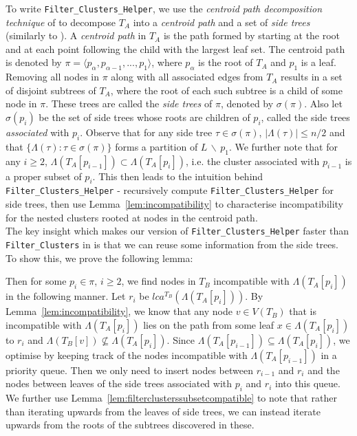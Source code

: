 \documentclass{article}
\newcommand{\leafset}{\Lambda}
\begin{document}
    To write \texttt{Filter\_Clusters\_Helper}, we use the \textit{centroid path decomposition technique} of \cite{cole2000n} to decompose $T_A$ into a \textit{centroid path} and a set of \textit{side trees} (similarly to \cite{jansson2018algorithms}). A \textit{centroid path} in $T_A$ is the path formed by starting at the root and at each point following the child with the largest leaf set. The centroid path is denoted by $\pi = \langle p_{\alpha}, p_{\alpha - 1}, ..., p_1 \rangle$, where $p_{\alpha}$ is the root of $T_A$ and $p_1$ is a leaf. Removing all nodes in $\pi$ along with all associated edges from $T_A$ results in a set of disjoint subtrees of $T_A$, where the root of each such subtree is a child of some node in $\pi$. These trees are called the \textit{side trees} of $\pi$, denoted by $\sigma(\pi)$. Also let $\sigma(p_i)$ be the set of side trees whose roots are children of $p_i$, called the side trees \textit{associated} with $p_i$. Observe that for any side tree $\tau \in \sigma(\pi)$, $|\leafset(\tau)| \leq n/2$ and that $\{\leafset(\tau) : \tau \in \sigma(\pi)\}$ forms a partition of $L\, \backslash\, {p_1}$. We further note that for any $i \geq 2$, $\leafset(T_A[p_{i - 1}]) \subset \leafset(T_A[p_i])$, i.e. the cluster associated with $p_{i-1}$ is a proper subset of $p_i$. This then leads to the intuition behind \texttt{Filter\_Clusters\_Helper} - recursively compute \texttt{Filter\_Clusters\_Helper} for side trees, then use Lemma~\ref{lem:incompatibility} to characterise incompatibility for the nested clusters rooted at nodes in the centroid path.\\

    The key insight which makes our version of \texttt{Filter\_Clusters\_Helper} faster than \texttt{Filter\_Clusters} in \cite{jansson2018algorithms} is that we can reuse some information from the side trees. To show this, we prove the following lemma:

    Then for some $p_i \in \pi$, $i \geq 2$, we find nodes in $T_B$ incompatible with $\leafset(T_A[p_i])$ in the following manner. Let $r_i$ be $lca^{T_B}(\leafset(T_A[p_i]))$. By Lemma~\ref{lem:incompatibility}, we know that any node $v \in V(T_B)$ that is incompatible with $\leafset(T_A[p_i])$ lies on the path from some leaf $x \in \leafset(T_A[p_i])$ to $r_i$ and $\leafset(T_B[v]) \not\subseteq \leafset(T_A[p_i])$. Since $\leafset(T_A[p_{i-1}]) \subseteq \leafset(T_A[p_i])$, we optimise by keeping track of the nodes incompatible with $\leafset(T_A[p_{i-1}])$ in a priority queue. Then we only need to insert nodes between $r_{i-1}$ and $r_i$ and the nodes between leaves of the side trees associated with $p_i$ and $r_i$ into this queue. We further use Lemma~\ref{lem:filterclusterssubsetcompatible} to note that rather than iterating upwards from the leaves of side trees, we can instead iterate upwards from the roots of the subtrees discovered in these.\\
\end{document}
